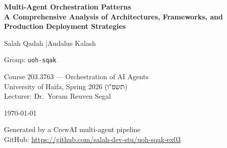 \documentclass[12pt, a4paper]{report}
\begin{document}
\begin{titlepage}
  \centering
  \vspace*{3cm}
  {\LARGE\bfseries\color{uohblue} Multi-Agent Orchestration Patterns\\[0.5em]
  \large A Comprehensive Analysis of Architectures, Frameworks, and\\
  Production Deployment Strategies}\par
  \vspace{2cm}
  {\large Salah Qadah \quad|\quad Andalus Kalash}\par
  \vspace{0.5em}
  {\normalsize Group: \texttt{uoh-sqak}}\par
  \vspace{2cm}
  {\normalsize Course 203.3763 --- Orchestration of AI Agents\\
  University of Haifa, Spring 2026 (\texthebrew{תשפ"ו})\\
  Lecturer: Dr.\ Yoram Reuven Segal}\par
  \vspace{1cm}
  {\normalsize\today}\par
  \vfill
  {\small Generated by a CrewAI multi-agent pipeline\\
  GitHub: \url{https://github.com/salah-dev-stu/uoh-sqak-ex03}}
\end{titlepage}

\tableofcontents
\newpage









\printbibliography[heading=bibintoc, title={Bibliography}]
\end{document}
